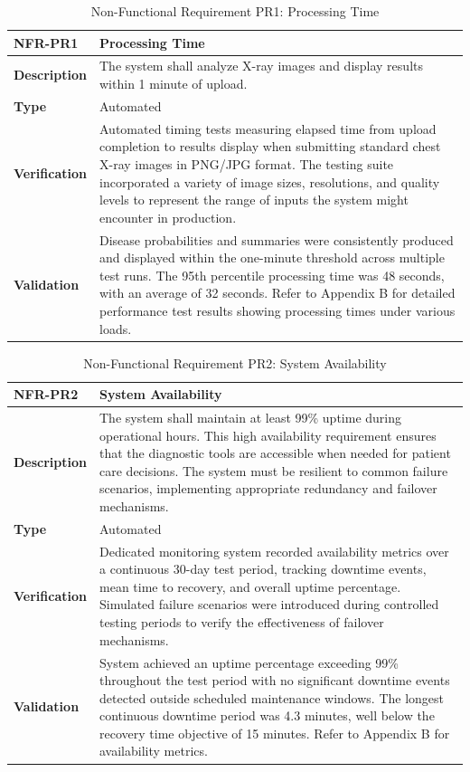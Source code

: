 \documentclass[12pt, titlepage]{article}
\begin{document}
\begin{table}[h!]
\centering
{}
\begin{tabular}{|p{3.5cm}|p{11.5cm}|}
\hline
\rowcolor{gray!30}
\textbf{NFR-PR1} & \textbf{Processing Time} \\
\hline
\textbf{Description} & The system shall analyze X-ray images and display results within 1 minute of upload. \\
\hline
\textbf{Type} & Automated \\
\hline
\textbf{Verification} & Automated timing tests measuring elapsed time from upload completion to results display when submitting standard chest X-ray images in PNG/JPG format. The testing suite incorporated a variety of image sizes, resolutions, and quality levels to represent the range of inputs the system might encounter in production. \\
\hline
\textbf{Validation} & Disease probabilities and summaries were consistently produced and displayed within the one-minute threshold across multiple test runs. The 95th percentile processing time was 48 seconds, with an average of 32 seconds. Refer to Appendix B for detailed performance test results showing processing times under various loads. \\
\hline
\end{tabular}
\caption{Non-Functional Requirement PR1: Processing Time}
\end{table}

\begin{table}[h!]
\centering
{}
\begin{tabular}{|p{3.5cm}|p{11.5cm}|}
\hline
\rowcolor{gray!30}
\textbf{NFR-PR2} & \textbf{System Availability} \\
\hline
\textbf{Description} & The system shall maintain at least 99\% uptime during operational hours. This high availability requirement ensures that the diagnostic tools are accessible when needed for patient care decisions. The system must be resilient to common failure scenarios, implementing appropriate redundancy and failover mechanisms. \\
\hline
\textbf{Type} & Automated \\
\hline
\textbf{Verification} & Dedicated monitoring system recorded availability metrics over a continuous 30-day test period, tracking downtime events, mean time to recovery, and overall uptime percentage. Simulated failure scenarios were introduced during controlled testing periods to verify the effectiveness of failover mechanisms. \\
\hline
\textbf{Validation} & System achieved an uptime percentage exceeding 99\% throughout the test period with no significant downtime events detected outside scheduled maintenance windows. The longest continuous downtime period was 4.3 minutes, well below the recovery time objective of 15 minutes. Refer to Appendix B for availability metrics. \\
\hline
\end{tabular}
\caption{Non-Functional Requirement PR2: System Availability}
\end{table}
\end{document}
